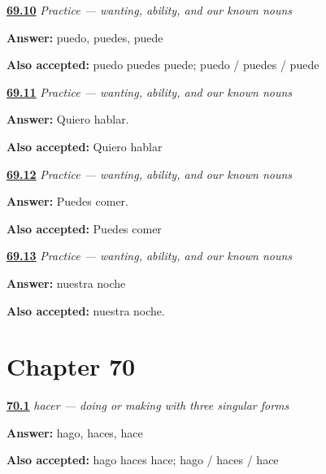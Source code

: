 \noindent\begin{minipage}[t]{\linewidth}
\raggedright
\hyperlink{review-ES-C11-practice-poder-forms}{\textbf{69.10}} \emph{Practice — wanting, ability, and our known nouns}\par
\small \textbf{Answer:} puedo, puedes, puede\par
\footnotesize \textbf{Also accepted:} puedo puedes puede; puedo / puedes / puede
\end{minipage}\par\medskip

\noindent\begin{minipage}[t]{\linewidth}
\raggedright
\hyperlink{review-ES-C11-practice-want-to-speak}{\textbf{69.11}} \emph{Practice — wanting, ability, and our known nouns}\par
\small \textbf{Answer:} Quiero hablar.\par
\footnotesize \textbf{Also accepted:} Quiero hablar
\end{minipage}\par\medskip

\noindent\begin{minipage}[t]{\linewidth}
\raggedright
\hyperlink{review-ES-C11-practice-can-eat}{\textbf{69.12}} \emph{Practice — wanting, ability, and our known nouns}\par
\small \textbf{Answer:} Puedes comer.\par
\footnotesize \textbf{Also accepted:} Puedes comer
\end{minipage}\par\medskip

\noindent\begin{minipage}[t]{\linewidth}
\raggedright
\hyperlink{review-ES-C11-practice-our-night}{\textbf{69.13}} \emph{Practice — wanting, ability, and our known nouns}\par
\small \textbf{Answer:} nuestra noche\par
\footnotesize \textbf{Also accepted:} nuestra noche.
\end{minipage}\par\medskip

\section*{Chapter 70}

\noindent\begin{minipage}[t]{\linewidth}
\raggedright
\hyperlink{review-ES-C12-hacer-singular-forms}{\textbf{70.1}} \emph{hacer — doing or making with three singular forms}\par
\small \textbf{Answer:} hago, haces, hace\par
\footnotesize \textbf{Also accepted:} hago haces hace; hago / haces / hace
\end{minipage}\par\medskip

